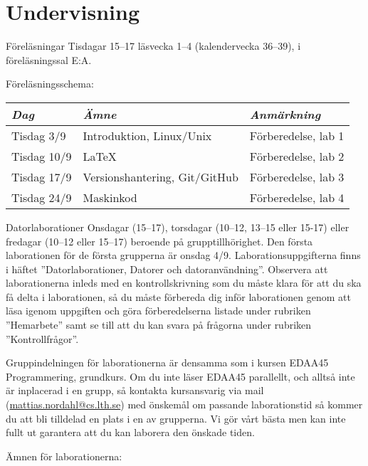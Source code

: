 \documentclass[a4paper]{memoir}
\begin{document}
\clearpage
\section*{Undervisning}

\begin{Items}
    \item[Föreläsningar]
    Tisdagar 15--17 läsvecka 1--4 (kalendervecka 36--39), i föreläsningssal E:A.

    Föreläsningsschema:

    {\hspace{0.5cm}
    \begin{tabular}{lll}
        \emph{Dag}  & \emph{Ämne}                   & \emph{Anmärkning}   \\ \midrule
        Tisdag 3/9  & Introduktion, Linux/Unix      & Förberedelse, lab 1 \\
        Tisdag 10/9 & \LaTeX                        & Förberedelse, lab 2 \\
        Tisdag 17/9 & Versionshantering, Git/GitHub & Förberedelse, lab 3 \\
        Tisdag 24/9 & Maskinkod                     & Förberedelse, lab 4 \\
    \end{tabular}
    }

    \item[Datorlaborationer]
    Onsdagar (15--17), torsdagar (10--12, 13--15 eller 15-17) eller fredagar (10--12 eller 15--17) beroende på grupptillhörighet. Den första laborationen för de första grupperna är onsdag 4/9. Laborationsuppgifterna finns i häftet ''Datorlaborationer, Datorer och datoranvändning''. Observera att laborationerna inleds med en kontrollskrivning som du måste klara för att du ska få delta i laborationen, så du måste förbereda dig inför laborationen genom att läsa igenom uppgiften och göra förberedelserna listade under rubriken ''Hemarbete'' samt se till att du kan svara på frågorna under rubriken ''Kontrollfrågor''.

    Gruppindelningen för laborationerna är densamma som i kursen EDAA45 Programmering, grundkurs. Om du inte läser EDAA45 parallellt, och alltså inte är inplacerad i en grupp, så kontakta kursansvarig via mail (\url{mattias.nordahl@cs.lth.se}) med önskemål om passande laborationstid så kommer du att bli tilldelad en plats i en av grupperna. Vi gör vårt bästa men kan inte fullt ut garantera att du kan laborera den önskade tiden.

    Ämnen för laborationerna:


\end{Items}
\end{document}
